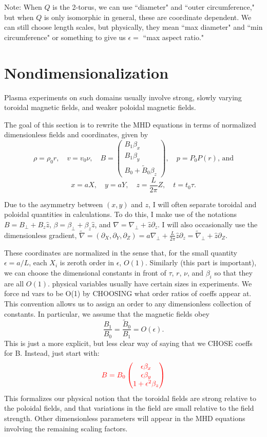 \documentclass{article}
\newcommand{\ep}{\epsilon}
\newcommand{\np}{\nabla_\perp}
\newcommand{\p}{\partial}
\newcommand{\til}[1]{\widetilde{ #1 }}
\newcommand{\pmat} [1] {\begin{pmatrix} #1 \end{pmatrix}}
\begin{document}
Note: When $Q$ is the 2-torus, we can use ``diameter" and ``outer circumference," but when $Q$ is only isomorphic in general, these are coordinate dependent. We can still choose length scales, but physically, they mean ``max diameter" and ``min circumference" or something to give us $\ep=$ ``max aspect ratio."


\section{Nondimensionalization}
Plasma experiments on such domains usually involve strong, slowly varying toroidal magnetic fields, and weaker poloidal magnetic fields. 

The goal of this section is to rewrite the MHD equations in terms of normalized dimensionless fields and coordinates, given by 
$$\rho = \rho_0r,\quad v = v_0\nu,\quad B = \pmat{B_1\beta_x \\ B_1\beta_y \\ B_0 + \til{B}_0\beta_z},\quad p = P_0P(r) \text{, and} $$
$$x=aX,\quad y=aY,\quad z=\frac{L}{2\pi}Z,\quad t=t_0\tau. $$
 
Due to the asymmetry between $(x,y)$ and $z$, I will often separate toroidal and poloidal quantities in calculations. To do this, I make use of the notations $B = B_\perp + B_z\hat{z}$, $\beta = \beta_\perp + \beta_z\hat{z}$, and $\nabla = \np + \hat{z}\p_z$. I will also occasionally use the dimensionless gradient, $\til{\nabla} = (\p_X, \p_Y, \p_Z) = a\np + \frac{L}{2\pi}\hat{z}\p_z = \til{\nabla}_\perp + \hat{z}\p_Z$.

These coordinates are normalized in the sense that, for the small quantity $\ep=a/L$, each $X_i$ is zeroth order in $\ep$, $O(1)$. Similarly {\color{red} (this part is important)}, we can choose the dimensional constants in front of $\tau$, $r$, $\nu$, and $\beta_i$ so that they are all $O(1)$. {\color{red} physical variables usually have certain sizes in experiments. We force nd vars to be O(1) by CHOOSING what order ratios of coeffs appear at.} This convention allows us to assign an order to any dimensionless collection of constants. In particular, we assume that the magnetic fields obey 
$$\frac{B_1}{B_0} = \frac{\til{B}_0}{B_1} = O(\ep). $$
{\color{red}This is just a more explicit, but less clear way of saying that we CHOSE coeffs for B. Instead, just start with: }
$$\color{red} B = B_0 \pmat{\ep\beta_x \\ \ep\beta_y \\ 1+\ep^2\beta_z}$$
This formalizes our physical notion that the toroidal fields are strong relative to the poloidal fields, and that variations in the field are small relative to the field strength. Other dimensionless parameters will appear in the MHD equations involving the remaining scaling factors. 
\end{document}
